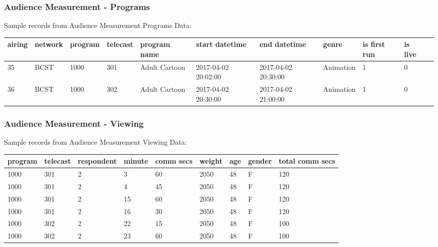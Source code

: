 \documentclass{beamer}
\begin{document}
\begin{frame}
\frametitle{Audience Measurement - Programs}
Sample records from Audience Measurement Programs Data:
  \begin{table}[h!]
    \centering
    \begin{adjustbox}{width=1\textwidth,center=\textwidth}
      \large
      \begin{tabular}{lllllllllll}
        airing & network & program & telecast & program name & start datetime & end datetime & genre & is first run & is live\\
        \hline
        35 & BCST & 1000 & 301 & Adult Cartoon & 2017-04-02 20:02:00 & 2017-04-02 20:30:00 & Animation & 1 & 0 \\
        36 & BCST & 1000 & 302 & Adult Cartoon & 2017-04-02 20:30:00 & 2017-04-02 21:00:00 & Animation & 1 & 0
      \end{tabular}
    \end{adjustbox}
  \end{table}


\end{frame}

\begin{frame}
\frametitle{Audience Measurement - Viewing}
Sample records from Audience Measurement Viewing Data:
  \begin{table}[h!]
    \centering
    \begin{adjustbox}{width=0.8\textwidth,center=\textwidth}
      \large
    \begin{tabular}{lllllllll}
      program & telecast & respondent & minute & comm secs & weight & age & gender & total comm secs\\
      \hline
      1000 & 301 & 2 & 3 & 60 & 2050 & 48 & F & 120\\
      1000 & 301 & 2 & 4 & 45 & 2050 & 48 & F & 120\\
      1000 & 301 & 2 & 15 & 60 & 2050 & 48 & F & 120\\
      1000 & 301 & 2 & 16 & 30 & 2050 & 48 & F & 120\\
      1000 & 302 & 2 & 22 & 15 & 2050 & 48 & F & 100\\
      1000 & 302 & 2 & 23 & 60 & 2050 & 48 & F & 100
    \end{tabular}
    \end{adjustbox}
  \end{table}
\end{frame}
\end{document}
